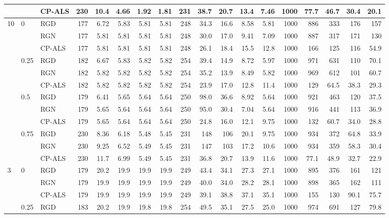 \begin{table}[!htbp]
{\begin{tabular}{lll*{15}{r}}
 &  & CP-ALS & 230 & 10.4 & 4.66 & 1.92 & 1.81 & 231 & 38.7 & 20.7 & 13.4 & 7.46 & 1000 & 77.7 & 46.7 & 30.4 & 20.1 \\
\midrule
10 & 0 & RGD & 177 & 6.72 & 5.83 & 5.81 & 5.81 & 248 & 34.3 & 16.6 & 8.58 & 5.81 & 1000 & 886 & 333 & 176 & 157 \\
 &  & RGN & 177 & 5.81 & 5.81 & 5.81 & 5.81 & 248 & 30.0 & 17.0 & 9.41 & 7.09 & 1000 & 887 & 317 & 171 & 130 \\
 &  & CP-ALS & 177 & 5.81 & 5.81 & 5.81 & 5.81 & 248 & 26.1 & 18.4 & 15.5 & 12.8 & 1000 & 166 & 125 & 116 & 54.9 \\
\addlinespace
 & 0.25 & RGD & 182 & 6.67 & 5.83 & 5.82 & 5.82 & 254 & 39.4 & 14.9 & 8.72 & 5.97 & 1000 & 971 & 631 & 110 & 70.1 \\
 &  & RGN & 182 & 5.82 & 5.82 & 5.82 & 5.82 & 254 & 35.2 & 13.9 & 8.49 & 5.82 & 1000 & 969 & 612 & 101 & 60.7 \\
 &  & CP-ALS & 182 & 5.82 & 5.82 & 5.82 & 5.82 & 254 & 23.9 & 17.0 & 12.8 & 11.4 & 1000 & 129 & 64.5 & 38.3 & 29.3 \\
\addlinespace
 & 0.5 & RGD & 179 & 6.41 & 5.65 & 5.64 & 5.64 & 250 & 98.0 & 36.6 & 8.92 & 5.64 & 1000 & 921 & 463 & 120 & 37.5 \\
 &  & RGN & 179 & 5.65 & 5.64 & 5.64 & 5.64 & 250 & 95.0 & 30.4 & 7.04 & 5.64 & 1000 & 916 & 441 & 113 & 36.9 \\
 &  & CP-ALS & 179 & 5.65 & 5.64 & 5.64 & 5.64 & 250 & 24.8 & 16.0 & 12.1 & 9.75 & 1000 & 132 & 60.7 & 34.0 & 28.8 \\
\addlinespace
 & 0.75 & RGD & 230 & 8.36 & 6.18 & 5.48 & 5.45 & 231 & 148 & 106 & 20.1 & 9.75 & 1000 & 934 & 372 & 64.8 & 33.9 \\
 &  & RGN & 230 & 9.25 & 6.52 & 5.49 & 5.45 & 231 & 147 & 103 & 17.2 & 10.6 & 1000 & 934 & 359 & 58.3 & 30.4 \\
 &  & CP-ALS & 230 & 11.7 & 6.99 & 5.49 & 5.45 & 231 & 36.8 & 20.7 & 13.9 & 11.6 & 1000 & 77.1 & 48.9 & 32.7 & 22.9 \\
\midrule
3 & 0 & RGD & 179 & 20.2 & 19.9 & 19.9 & 19.9 & 249 & 43.4 & 34.1 & 27.3 & 27.1 & 1000 & 895 & 376 & 161 & 121 \\
 &  & RGN & 179 & 19.9 & 19.9 & 19.9 & 19.9 & 249 & 40.0 & 34.0 & 28.2 & 28.1 & 1000 & 898 & 365 & 162 & 111 \\
 &  & CP-ALS & 179 & 19.9 & 19.9 & 19.9 & 19.9 & 249 & 39.1 & 38.8 & 37.1 & 35.1 & 1000 & 155 & 130 & 90.1 & 75.7 \\
\addlinespace
 & 0.25 & RGD & 183 & 20.2 & 19.9 & 19.8 & 19.8 & 254 & 49.5 & 35.1 & 27.5 & 25.0 & 1000 & 974 & 691 & 127 & 79.8 \\

\end{tabular}}
\end{table}

